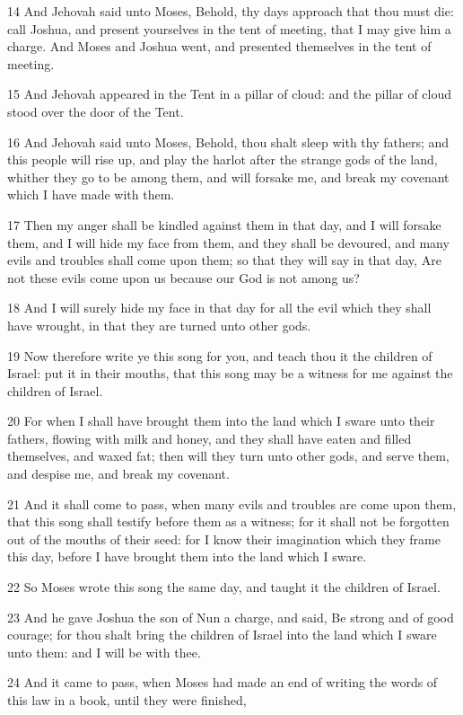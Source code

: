 \par 14 And Jehovah said unto Moses, Behold, thy days approach that thou must die: call Joshua, and present yourselves in the tent of meeting, that I may give him a charge. And Moses and Joshua went, and presented themselves in the tent of meeting.
\par 15 And Jehovah appeared in the Tent in a pillar of cloud: and the pillar of cloud stood over the door of the Tent.
\par 16 And Jehovah said unto Moses, Behold, thou shalt sleep with thy fathers; and this people will rise up, and play the harlot after the strange gods of the land, whither they go to be among them, and will forsake me, and break my covenant which I have made with them.
\par 17 Then my anger shall be kindled against them in that day, and I will forsake them, and I will hide my face from them, and they shall be devoured, and many evils and troubles shall come upon them; so that they will say in that day, Are not these evils come upon us because our God is not among us?
\par 18 And I will surely hide my face in that day for all the evil which they shall have wrought, in that they are turned unto other gods.
\par 19 Now therefore write ye this song for you, and teach thou it the children of Israel: put it in their mouths, that this song may be a witness for me against the children of Israel.
\par 20 For when I shall have brought them into the land which I sware unto their fathers, flowing with milk and honey, and they shall have eaten and filled themselves, and waxed fat; then will they turn unto other gods, and serve them, and despise me, and break my covenant.
\par 21 And it shall come to pass, when many evils and troubles are come upon them, that this song shall testify before them as a witness; for it shall not be forgotten out of the mouths of their seed: for I know their imagination which they frame this day, before I have brought them into the land which I sware.
\par 22 So Moses wrote this song the same day, and taught it the children of Israel.
\par 23 And he gave Joshua the son of Nun a charge, and said, Be strong and of good courage; for thou shalt bring the children of Israel into the land which I sware unto them: and I will be with thee.
\par 24 And it came to pass, when Moses had made an end of writing the words of this law in a book, until they were finished,
